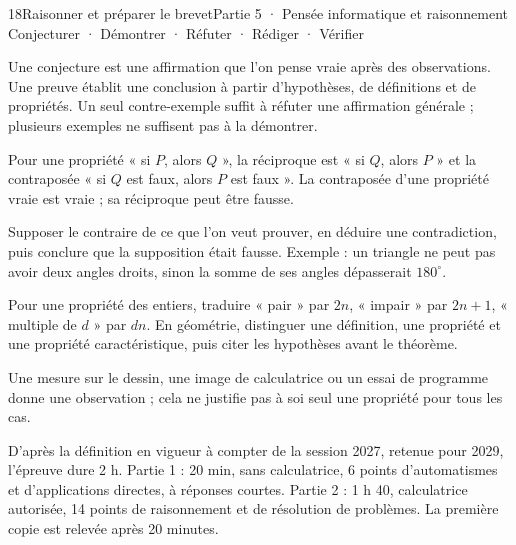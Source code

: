 \begin{ouverture}[algorithmique]{18}{Raisonner et préparer le brevet}{Partie 5 · Pensée informatique et raisonnement}
{Conjecturer · Démontrer · Réfuter · Rédiger · Vérifier}
\end{ouverture}
\pagestyle{otMain}\essentiel\fontsize{11}{15}\selectfont
{}
\begin{definition}Une conjecture est une affirmation que l’on pense vraie après des observations. Une preuve établit une conclusion à partir d’hypothèses, de définitions et de propriétés. Un seul contre-exemple suffit à réfuter une affirmation générale ; plusieurs exemples ne suffisent pas à la démontrer.\end{definition}
\begin{definition}Pour une propriété « si $P$, alors $Q$ », la réciproque est « si $Q$, alors $P$ » et la contraposée « si $Q$ est faux, alors $P$ est faux ». La contraposée d’une propriété vraie est vraie ; sa réciproque peut être fausse.\end{definition}
\begin{savoirfaire}Supposer le contraire de ce que l’on veut prouver, en déduire une contradiction, puis conclure que la supposition était fausse. Exemple : un triangle ne peut pas avoir deux angles droits, sinon la somme de ses angles dépasserait $180^\circ$.\end{savoirfaire}
\begin{savoirfaire}[Démontrer]Pour une propriété des entiers, traduire « pair » par $2n$, « impair » par $2n+1$, « multiple de $d$ » par $dn$. En géométrie, distinguer une définition, une propriété et une propriété caractéristique, puis citer les hypothèses avant le théorème.\end{savoirfaire}
\begin{attention}Une mesure sur le dessin, une image de calculatrice ou un essai de programme donne une observation ; cela ne justifie pas à soi seul une propriété pour tous les cas.\end{attention}
\clearpage
{}
\begin{savoirfaire}D’après la définition en vigueur à compter de la session 2027, retenue pour 2029, l’épreuve dure 2 h. Partie 1 : 20 min, sans calculatrice, 6 points d’automatismes et d’applications directes, à réponses courtes. Partie 2 : 1 h 40, calculatrice autorisée, 14 points de raisonnement et de résolution de problèmes. La première copie est relevée après 20 minutes.\end{savoirfaire}
